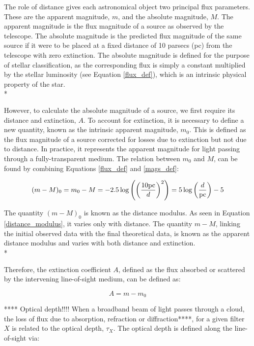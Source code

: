 \documentclass[12pt, a4paper]{report}
\begin{document}
The role of distance gives each astronomical object two principal flux parameters. These are the apparent magnitude, $m$, and the absolute magnitude, $M$. The apparent magnitude is the flux magnitude of a source as observed by the telescope. The absolute magnitude is the predicted flux magnitude of the same source if it were to be placed at a fixed distance of 10 parsecs (pc) from the telescope with zero extinction. The absolute magnitude is defined for the purpose of stellar classification, as the corresponding flux is simply a constant multiplied by the stellar luminosity (see Equation \ref{flux_def}), which is an intrinsic physical property of the star. \\*

However, to calculate the absolute magnitude of a source, we first require its distance and extinction, $A$. To account for extinction, it is necessary to define a new quantity, known as the intrinsic apparent magnitude, $m_{0}$. This is defined as the flux magnitude of a source corrected for losses due to extinction but not due to distance. In practice, it represents the apparent magnitude for light passing through a fully-transparent medium. The relation between $m_{0}$ and $M$, can be found by combining Equations \ref{flux_def} and \ref{mags_def}:

\begin{equation}
\label{distance_modulus}
(m - M)_{0} = m_{0} - M = -2.5\log \left( \left(\frac{10\textnormal{pc}}{d}\right)^{2} \right) = 5\log\left(\frac{d}{\textnormal{pc}}\right) - 5
\end{equation}

The quantity $(m - M)_{0}$ is known as the distance modulus. As seen in Equation \ref{distance_modulus}, it varies only with distance. The quantity $m - M$, linking the initial observed data with the final theoretical data, is known as the apparent distance modulus and varies with both distance and extinction. \\*

Therefore, the extinction coefficient $A$, defined as the flux absorbed or scattered by the intervening line-of-sight medium, can be defined as:

\begin{equation}
A = m - m_{0}
\label{bol_extinc}
\end{equation}

****
Optical depth!!!!
When a broadband beam of light passes through a cloud, the loss of flux due to absorption, refraction or diffraction****, for a given filter $X$ is related to the optical depth, $\tau_{X}$. The optical depth is defined along the line-of-sight via:
\end{document}
